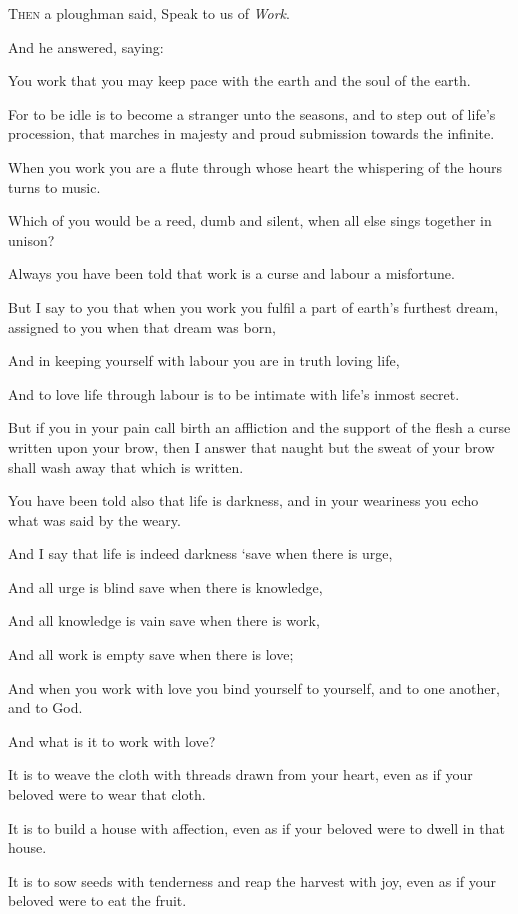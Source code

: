 \lettrine{T}{hen} a ploughman said, Speak
to us of \textit{Work}.

\medskip
And he answered, saying:

You work that you may keep pace with the
earth and the soul of the earth.

For to be idle is to become a stranger
unto the seasons, and to step out of
life’s procession, that marches in
majesty and proud submission towards the
infinite.

When you work you are a flute through
whose heart the whispering of the hours
turns to music.

Which of you would be a reed, dumb and
silent, when all else sings together in
unison?

Always you have been told that work is a
curse and labour a misfortune.

But I say to you that when you work you
fulfil a part of earth’s furthest dream,
assigned to you when that dream was
born,

And in keeping yourself with labour you
are in truth loving life,

And to love life through labour is to be
intimate with life’s inmost secret.


But if you in your pain call birth an
affliction and the support of the flesh
a curse written upon your brow, then I
answer that naught but the sweat of
your brow shall wash away that which is
written.

You have been told also that life is
darkness, and in your weariness you echo
what was said by the weary.

And I say that life is indeed darkness
`save when there is urge,

And all urge is blind save when there is
knowledge,

And all knowledge is vain save when
there is work,

And all work is empty save when there is
love;

And when you work with love you bind
yourself to yourself, and to one
another, and to God.



And what is it to work with love?

It is to weave the cloth with threads
drawn from your heart, even as if your
beloved were to wear that cloth.

It is to build a house with affection,
even as if your beloved were to dwell in
that house.

It is to sow seeds with tenderness and
reap the harvest with joy, even as if
your beloved were to eat the fruit.

